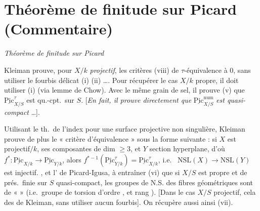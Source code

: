 \documentclass[11pt,a4paper]{article}
\begin{document}
\section{Théorème de finitude sur Picard (Commentaire)}

\emph{Théorème de finitude sur Picard} 

Kleiman prouve, pour $X/k$ \emph{projectif}, les critères (viii) de $\tau$-équivalence à $0$, sans utiliser le fourbis délicat (i) (ii) …. Pour récupérer le cas $X/k$ propre, il doit utiliser (i) (via lemme de Chow). Avec le même grain de sel, il prouve (v) que $\underline{\mathrm{Pic}}^{\tau}_{X/S}$ est qu.-cpt.\ sur $S$. [\emph{En fait, il prouve directement que} $\underline{\mathrm{Pic}}^{\mathrm{num}}_{X/S}$ \emph{est quasi-compact} …].

\marginal{||} Utilisant le th.\ de l'index pour une surface projective non singulière, Kleiman prouve de plus le « critère d'équivalence » sous la forme suivante : si $X$ est projectif$/k$,  ses composantes de dim $\geqslant 3$, et $Y$ section hyperplane, d'où $f^{*}\colon \underline{\mathrm{Pic}}_{X/k} \to \underline{\mathrm{Pic}}_{Y/k}$,  alors $f^{*-1}(\underline{\mathrm{Pic}}^{\tau}_{Y/k}) = \underline{\mathrm{Pic}}^{\tau}_{X/k}$, i.e.\    
$\mathrm{NSL}(X) \to \mathrm{NSL}(Y)$ est injectif.  , et l' de Picard-Igusa,   à entraîner (vi) que si $X/S$ est propre et de prés.\ finie sur  $S$ quasi-compact, les groupes de N.S. des fibres géométriques sont de  \struck{\ill{}} «  »  (i.e.\ groupe de torsion d'ordre , et rang ). [Dans le cas $X/S$ projectif, cela   des  de Kleiman, sans utiliser aucun fourbis]. On récupère aussi ainsi (vii).

\end{document}
